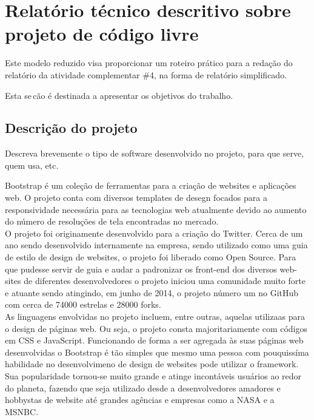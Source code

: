 \documentclass[12pt,a4paper]{article} %
\newcommand\BackgroundStructure{ %
\setlength{\unitlength}{1mm} %

\setlength\fboxsep{0mm} %
\setlength\fboxrule{0.5mm} %
\put(10, 20pr){\fcolorbox{black}{gray!5}{\framebox(155,247){}}} %
\put(165, 20){\fcolorbox{black}{gray!10}{\framebox(37,247){}}} %
\put(10, 262){\fcolorbox{black}{white!10}{\framebox(192, 25){}}} %
\put(175, 263){\texttt{[image: ]}} %
}
\begin{document}


\section{Relatório técnico descritivo sobre projeto de código livre} 

Este modelo reduzido visa proporcionar um roteiro prático para a redação do relatório da atividade complementar \#4, na forma de relatório simplificado. 

Esta se\,c\~ao \'e destinada a apresentar os objetivos do trabalho.\\

\subsection{Descrição do projeto}

Descreva brevemente o tipo de software desenvolvido no projeto, para que serve, quem usa, etc.

Bootstrap é um coleção de ferramentas para a criação de websites e aplicações web. O projeto conta com diversos templates de desegn focados para a responsividade necessária para as tecnologias web atualmente devido ao aumento do número de resoluções de tela encontradas no mercado. \\
O projeto foi originamente desenvolvido para a criação do Twitter. Cerca de um ano sendo desenvolvido internamente na empresa, sendo utilizado como uma guia de estilo de design de websites, o projeto foi liberado como Open Source. Para que pudesse servir de guia e audar a padronizar os front-end dos diversos web-sites de diferentes desenvolvedores o projeto iniciou uma comunidade muito forte e atuante sendo atingindo, em junho de 2014, o projeto número um no GitHub com cerca de 74000 estrelas e 28000 forks.\\
As linguagens envolvidas no projeto incluem, entre outras, aquelas utilizaas para o design de páginas web. Ou seja, o projeto consta majoritariamente com códigos em CSS e JavaScript. Funcionando de forma a ser agregada às suas páginas web desenvolvidas o Bootstrap é tão simples que mesmo uma pessoa com pouquissíma habilidade no desenvolvimeno de design de websites pode utilizar o framework. Sua popularidade tornou-se muito grande e atinge incontáveis usuários ao redor do planeta, fazendo que seja utilizado desde a desenvolvedores amadores e hobbystas de website até grandes agências e empresas como a NASA e a MSNBC.
\end{document}
